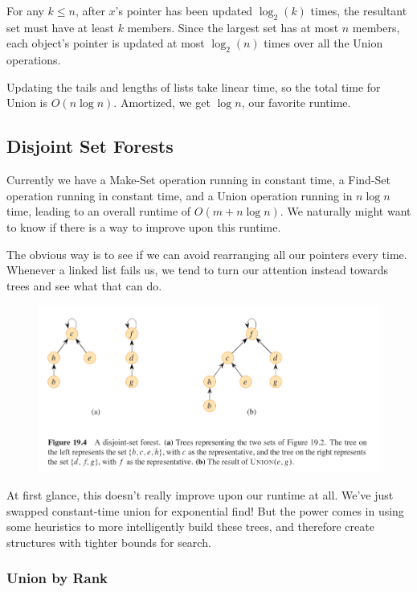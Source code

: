 \documentclass[]{article}
\begin{document}
    For any $k \leq n$, after $x$'s pointer has been updated $\log_2(k)$ times, the resultant set must have at least $k$ members. Since the largest set has at most $n$ members, each object's pointer is updated at most $\log_2(n)$ times over all the Union operations.

    Updating the tails and lengths of lists take linear time, so the total time for Union is $O(n\log n)$. Amortized, we get $\log n$, our favorite runtime.

    \subsection*{Disjoint Set Forests}

    Currently we have a Make-Set operation running in constant time, a Find-Set operation running in constant time, and a Union operation running in $n \log n$ time, leading to an overall runtime of $O(m + n \log n)$. We naturally might want to know if there is a way to improve upon this runtime. 

    The obvious way is to see if we can avoid rearranging all our pointers every time. Whenever a linked list fails us, we tend to turn our attention instead towards trees and see what that can do. 

    \begin{figure}[h]
        \includegraphics[width=\textwidth]{disjoint-forest.png}
    \end{figure}

    At first glance, this doesn't really improve upon our runtime at all. We've just swapped constant-time union for exponential find! But the power comes in using some heuristics to more intelligently build these trees, and therefore create structures with tighter bounds for search. 

    \subsubsection*{Union by Rank}
\end{document}
